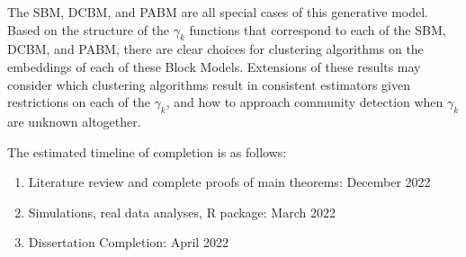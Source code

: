 \documentclass[
  11pt,
]{article}
\begin{document}
The SBM, DCBM, and PABM are all special cases of this generative model.
Based on the structure of the \(\gamma_k\) functions that correspond to
each of the SBM, DCBM, and PABM, there are clear choices for clustering
algorithms on the embeddings of each of these Block Models. Extensions
of these results may consider which clustering algorithms result in
consistent estimators given restrictions on each of the \(\gamma_k\),
and how to approach community detection when \(\gamma_k\) are unknown
altogether.

The estimated timeline of completion is as follows:

\begin{enumerate}
\def\labelenumi{\arabic{enumi}.}
\item
  Literature review and complete proofs of main theorems: December 2022
\item
  Simulations, real data analyses, R package: March 2022
\item
  Dissertation Completion: April 2022
\end{enumerate}

  
\end{document}
